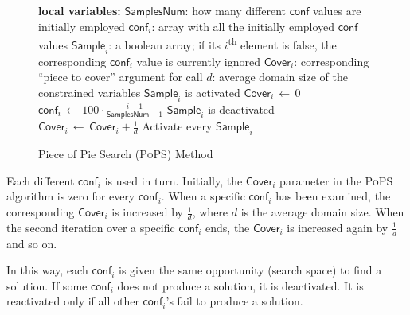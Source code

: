 \documentclass{ws-ijait}
\begin{document}
\begin{figure}
  \centering
  \begin{algorithmic}
      \State \textbf{local variables:}
      \State \quad $\mathsf{SamplesNum}$: how many different
             $\mathsf{conf}$ values are initially employed
      \State \quad $\mathsf{conf}_i$: array with all the
             initially employed $\mathsf{conf}$ values
      \State \quad $\mathsf{Sample}_i$: a boolean array;
             if its $i$\textsuperscript{th} element is
             false, the corresponding
      \State \qquad \qquad \quad $\mathsf{conf}_i$ value is
             currently ignored
      \State \quad $\mathsf{Cover}_i$: corresponding ``piece
             to cover'' argument for  call
      \State \quad $d$: average domain size of the
             constrained variables
      \State
        \State $\mathsf{Sample}_i$ is activated
        \State $\mathsf{Cover}_i \, \gets \, 0$
        \State $\mathsf{conf}_i \, \gets \,
                100 \cdot \frac{i - 1}{\mathsf{SamplesNum} - 1}$
      \EndFor
            \State $\mathsf{Sample}_i$ is deactivated
          \EndIf
          \State $\mathsf{Cover}_i \, \gets \,
                  \mathsf{Cover}_i + \frac{1}{d}$
        \EndFor
          \State Activate every $\mathsf{Sample}_i$
        \EndIf
      \EndWhile
    \EndFunction
  \end{algorithmic}
  \caption{Piece of Pie Search ({\normalfont\textsc{PoPS}})
           Method\label{PoPS-algorithm}}
\end{figure}

Each different $\mathsf{conf}_i$ is used in turn. Initially,
the $\mathsf{Cover}_i$ parameter in the \textsc{PoPS}
algorithm is zero for every $\mathsf{conf}_i$. When a
specific $\mathsf{conf}_i$ has been examined, the
corresponding $\mathsf{Cover}_i$ is increased by
$\frac{1}{d}$, where $d$ is the average domain size. When
the second iteration over a specific $\mathsf{conf}_i$ ends,
the $\mathsf{Cover}_i$ is increased again by $\frac{1}{d}$
and so on.

In this way, each $\mathsf{conf}_i$ is given the same
opportunity (search space) to find a solution. If some
$\mathsf{conf}_i$ does not produce a solution, it is
deactivated. It is reactivated only if all other
$\mathsf{conf}_i$'s fail to produce a solution.
\end{document}
